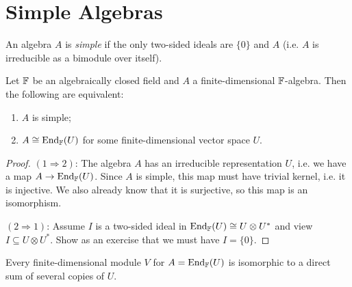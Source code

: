 \section{Simple Algebras}

\begin{definition}
  An algebra $A$ is \emph{simple} if
  the only two-sided ideals are
  $\{0\}$ and $A$ (i.e. $A$ is irreducible
  as a bimodule over itself).
\end{definition}

\begin{theorem}
  Let $\mathbb{F}$ be an algebraically closed
  field and $A$ a finite-dimensional
  $\mathbb{F}$-algebra. Then the following are
  equivalent:
  \begin{enumerate}
    \item $A$ is simple;
    \item $A \cong \operatorname{End}_{\mathbb{F}}(U)$ for
      some finite-dimensional vector space
      $U$.
  \end{enumerate}
\end{theorem}

\begin{proof}
  $(1 \Rightarrow 2)$: The algebra
  $A$ has an irreducible representation
  $U$, i.e. we have a map
  $A \to \operatorname{End}_{\mathbb{F}}(U)$. Since $A$ is
  simple, this map must have trivial kernel,
  i.e. it is injective.
  We also already
  know that it is surjective, so
  this map is an isomorphism.

  $(2 \Rightarrow 1)$: Assume $I$ is a
  two-sided ideal in $\operatorname{End}_{\mathbb{F}}(U) \cong U \otimes U^*$
  and view $I \subseteq U \otimes U^*$.
  Show as an exercise
  that we must have $I = \{0\}$.
\end{proof}

\begin{theorem}
  Every finite-dimensional module
  $V$ for $A = \operatorname{End}_{\mathbb{F}}(U)$ is isomorphic
  to a direct sum of several copies of $U$.
\end{theorem}

